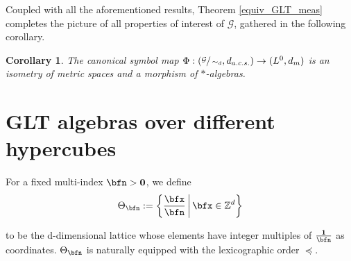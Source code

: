 \documentclass{amsart}
\newtheorem{cor}[thm]{Corollary}
\begin{document}
    Coupled with all the aforementioned results, Theorem \ref{equiv_GLT_meas} completes the picture of all properties of interest of $\mathcal{G}$, gathered in the following corollary.
    \begin{cor}
        The canonical symbol map $\Phi:(\sfrac{\mathcal{G}}{\sim_d},d_{a.c.s.})\to(L^0,d_m)$ is an isometry of metric spaces and a morphism of $*$-algebras. 
    \end{cor}


\section{GLT algebras over different hypercubes}\label{sec-hypercube}

For a fixed multi-index $\bfn>\bf0$, we define 
\begin{equation*}
	\Theta_{\bfn}:=\biggl\{\frac{\bfx}{\bfn}\,\bigg|\,\bfx\in\mathbb{Z}^d\biggr\}
\end{equation*}

    to be the d-dimensional lattice whose elements have integer multiples of $\frac{\bf1}{\bfn}$ as coordinates. $\Theta_{\bfn}$ is naturally equipped with the lexicographic order $\preceq$. 
    
\end{document}
